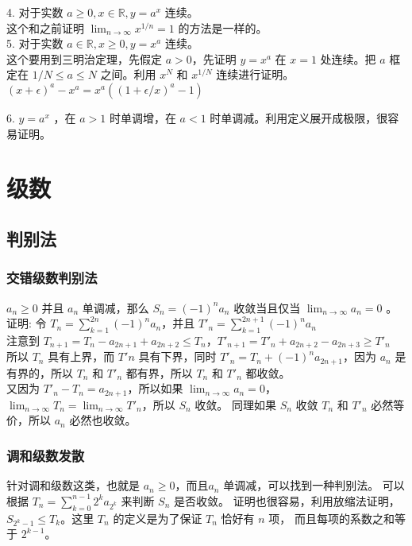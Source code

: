 4. 对于实数 $a \ge 0, x \in \mathbb{R}, y = a^x$ 连续。 \\

这个和之前证明 $\lim_{n \to \infty}x^{1/n} = 1$ 的方法是一样的。\\

5. 对于实数 $a \in \mathbb{R}, x \ge 0, y = x^a$ 连续。 \\
这个要用到三明治定理，先假定 $a >0$，先证明 $y = x^a$ 在 $x = 1$ 处连续。把 $a $ 框定在 $1/N \le a \le N $ 之间。利用 $x^N$ 和 $x^{1/N}$ 连续进行证明。
$(x+\epsilon)^a - x^a = x^a((1+\epsilon/x)^a-1)$

6. $y = a^x$ ，在 $a > 1$ 时单调增，在 $a < 1$ 时单调减。利用定义展开成极限，很容易证明。

\section{级数}

\subsection{判别法}

\subsubsection{交错级数判别法}
$a_n \ge 0 $ 并且 $a_n$ 单调减，那么 $S_n = (-1)^na_n$ 收敛当且仅当 $\lim_{n \to \infty}a_n = 0$ 。
证明: 令 $T_n = \sum_{k=1}^{2n}(-1)^na_n$，并且 $T'_n = \sum_{k=1}^{2n+1}(-1)^na_n$ \\
注意到 $T_{n+1} = T_n  - a_{2n+1} + a_{2n+2} \le T_n$，$T'_{n+1} = T'_n  + a_{2n+2} - a_{2n+3} \ge T'_n$ \\
所以 $T_n $ 具有上界，而 $T'n$ 具有下界，同时 $T'_n = T_n + (-1)^na_{2n+1}$，因为 $a_n$ 是有界的，所以 $T_n$ 和 $T'_n$ 都有界，所以
$T_n$ 和 $T'_n$ 都收敛。\\
又因为 $T'_n - T_n = a_{2n+1}$，所以如果 $\lim_{n \to \infty} a_n = 0$，$\lim_{n \to \infty}T_n = \lim_{n \to \infty} T'_n$，所以 $S_n$ 收敛。
同理如果 $S_n$ 收敛 $T_n$ 和 $T'_n$ 必然等价，所以 $a_n$ 必然也收敛。

\subsubsection{调和级数发散}
针对调和级数这类，也就是 $a_n \ge 0$，而且$a_n$ 单调减，可以找到一种判别法。
可以根据 $T_n = \sum_{k = 0}^{n-1}2^ka_{2^k}$ 来判断 $S_n$ 是否收敛。
证明也很容易，利用放缩法证明，$S_{2^k-1} \le T_k$。这里 $T_n$ 的定义是为了保证 $T_n$ 恰好有 $n$ 项，
而且每项的系数之和等于 $2^{k-1}$。

